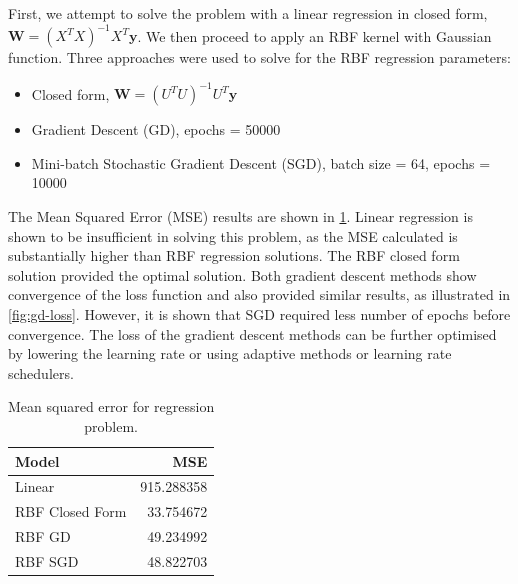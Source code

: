 \documentclass{article}
\begin{document}
First, we attempt to solve the problem with a linear regression in closed form, $\pmb{W} = (X^T X)^{-1} X^T \pmb{y}$. We then proceed to apply an RBF kernel with Gaussian function. Three approaches were used to solve for the RBF regression parameters:
\begin{itemize}
    \item Closed form, $\pmb{W} = (U^T U)^{-1} U^T \pmb{y}$
    \item Gradient Descent (GD), epochs = 50000
    \item Mini-batch Stochastic Gradient Descent (SGD), batch size = 64, epochs = 10000
\end{itemize}
The Mean Squared Error (MSE) results are shown in \cref{tab:mse-regression}. Linear regression is shown to be insufficient in solving this problem, as the MSE calculated is substantially higher than RBF regression solutions. The RBF closed form solution provided the optimal solution. Both gradient descent methods show convergence of the loss function and also provided similar results, as illustrated in \cref{fig:gd-loss}. However, it is shown that SGD required less number of epochs before convergence. The loss of the gradient descent methods can be further optimised by lowering the learning rate or using adaptive methods or learning rate schedulers.

\begin{table}
    \centering
    \caption{Mean squared error for regression problem.}
    \label{tab:mse-regression}
    \begin{tabular}{lr}
    \toprule
    Model &         MSE \\
    \midrule
    Linear          &  915.288358 \\
    RBF Closed Form &   33.754672 \\
    RBF GD          &   49.234992 \\
    RBF SGD         &   48.822703 \\
    \bottomrule
    \end{tabular}
\end{table}
\end{document}
